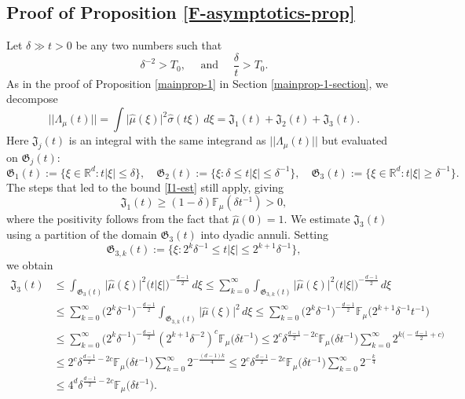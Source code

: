 \documentclass[a4paper,11pt]{amsart}
\numberwithin{equation}{section}
\begin{document}
\subsection{Proof of Proposition \ref{F-asymptotics-prop}} 
\noindent Let $\delta \gg t > 0$ be any two numbers such that 
\begin{equation} \label{delta-T}
\delta^{-2} > T_0, \quad \text{ and } \quad \frac{\delta}{t} > T_0. 
\end{equation} 
As in the proof of Proposition \ref{mainprop-1} in Section \ref{mainprop-1-section}, we decompose 
\begin{equation}  \label{Lambda-decomp-J}
||\Lambda_{\mu}(t) || = \int \bigl| \widehat{\mu}(\xi) \bigr|^2 \widehat{\sigma}(t \xi) \, d\xi =  \mathfrak J_1(t) + \mathfrak J_2(t) + \mathfrak J_3(t). 
\end{equation}    
Here $\mathfrak J_j(t)$ is an integral with the same integrand as $||\Lambda_{\mu}(t)||$ but evaluated on $\mathfrak G_j(t)$: 
\[\mathfrak G_1(t) := \bigl\{\xi \in \mathbb R^d : t|\xi| \leq \delta \bigr\}, \quad  \mathfrak G_2(t) := \bigl\{\xi : \delta \leq t|\xi| \leq \delta^{-1} \bigr\}, \quad  \mathfrak G_3(t) := \bigl\{\xi \in \mathbb R^d : t|\xi| \geq \delta^{-1} \bigr\}. \] 
The steps that led to the bound \eqref{I1-est} still apply, giving       
\begin{equation}  \label{J1-est} 
\mathfrak J_1(t) \geq (1 - \delta) \mathbb F_{\mu}(\delta t^{-1}) > 0,  
\end{equation}  
where the positivity follows from the fact that $\widehat{\mu}(0) = 1$. We estimate $\mathfrak J_3(t)$ using a partition of the domain $\mathfrak G_3(t)$ into dyadic annuli. Setting 
\[\mathfrak G_{3,k}(t) := \bigl\{\xi: 2^{k}\delta^{-1} \leq t|\xi| \leq 2^{k+1} \delta^{-1}\bigr\}, \] we obtain 
\begin{align}
\mathfrak J_3(t) &\leq \int_{\mathfrak G_3(t)} \bigl| \widehat{\mu}(\xi) \bigr|^2 \bigl(t |\xi| \bigr)^{-\frac{d-1}{2}} \, d\xi  \leq \sum_{k=0}^{\infty} \int_{\mathfrak G_{3,k}(t)}  \bigl| \widehat{\mu}(\xi) \bigr|^2 \bigl(t |\xi| \bigr)^{-\frac{d-1}{2}} \, d\xi \nonumber \\
&\leq \sum_{k=0}^{\infty} \bigl(2^k \delta^{-1}\bigr)^{-\frac{d-1}{2}} \int_{\mathfrak G_{3,k}(t)}  \bigl| \widehat{\mu}(\xi) \bigr|^2 \, d\xi \leq \sum_{k=0}^{\infty} \bigl(2^k \delta^{-1}\bigr)^{-\frac{d-1}{2}} \mathbb F_{\mu} \bigl(2^{k+1} \delta^{-1} t^{-1}\bigr) \nonumber \\ 
&\leq \sum_{k=0}^{\infty} \bigl(2^k \delta^{-1}\bigr)^{-\frac{d-1}{2}}  (2^{k+1} \delta^{-2})^c \mathbb F_{\mu} \bigl(\delta t^{-1}\bigr)
\leq 2^c \delta^{\frac{d-1}{2} - 2c} \mathbb F_{\mu} \bigl(\delta t^{-1}\bigr)  \sum_{k=0}^{\infty} 2^{k\bigl(-\frac{d-1}{2} + c\bigr)} \nonumber \\
&\leq  2^c \delta^{\frac{d-1}{2} - 2c} \mathbb F_{\mu} \bigl(\delta t^{-1}\bigr)  \sum_{k=0}^{\infty} 2^{-\frac{(d-1)k}{4}} \leq  2^c \delta^{\frac{d-1}{2} - 2c} \mathbb F_{\mu} \bigl(\delta t^{-1}\bigr)  \sum_{k=0}^{\infty} 2^{-\frac{k}{4}} \nonumber \\  &\leq 4^d \delta^{\frac{d-1}{2} - 2c} \mathbb F_{\mu} \bigl(\delta t^{-1}\bigr). \label{J3-est}
\end{align} 
\end{document}
